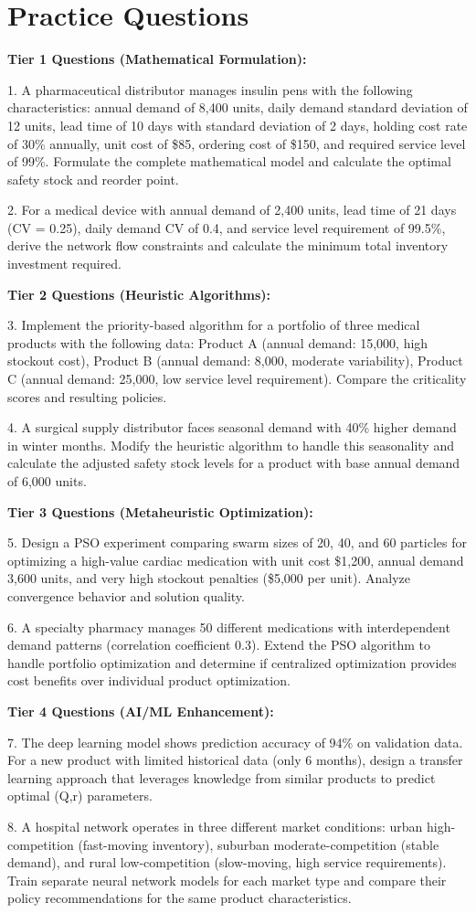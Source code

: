 \documentclass{article}
\begin{document}
\section{Practice Questions}

\textbf{Tier 1 Questions (Mathematical Formulation):}

1. A pharmaceutical distributor manages insulin pens with the following characteristics: annual demand of 8,400 units, daily demand standard deviation of 12 units, lead time of 10 days with standard deviation of 2 days, holding cost rate of 30\% annually, unit cost of \$85, ordering cost of \$150, and required service level of 99\%. Formulate the complete mathematical model and calculate the optimal safety stock and reorder point.

2. For a medical device with annual demand of 2,400 units, lead time of 21 days (CV = 0.25), daily demand CV of 0.4, and service level requirement of 99.5\%, derive the network flow constraints and calculate the minimum total inventory investment required.

\textbf{Tier 2 Questions (Heuristic Algorithms):}

3. Implement the priority-based algorithm for a portfolio of three medical products with the following data: Product A (annual demand: 15,000, high stockout cost), Product B (annual demand: 8,000, moderate variability), Product C (annual demand: 25,000, low service level requirement). Compare the criticality scores and resulting policies.

4. A surgical supply distributor faces seasonal demand with 40\% higher demand in winter months. Modify the heuristic algorithm to handle this seasonality and calculate the adjusted safety stock levels for a product with base annual demand of 6,000 units.

\textbf{Tier 3 Questions (Metaheuristic Optimization):}

5. Design a PSO experiment comparing swarm sizes of 20, 40, and 60 particles for optimizing a high-value cardiac medication with unit cost \$1,200, annual demand 3,600 units, and very high stockout penalties (\$5,000 per unit). Analyze convergence behavior and solution quality.

6. A specialty pharmacy manages 50 different medications with interdependent demand patterns (correlation coefficient 0.3). Extend the PSO algorithm to handle portfolio optimization and determine if centralized optimization provides cost benefits over individual product optimization.

\textbf{Tier 4 Questions (AI/ML Enhancement):}

7. The deep learning model shows prediction accuracy of 94\% on validation data. For a new product with limited historical data (only 6 months), design a transfer learning approach that leverages knowledge from similar products to predict optimal (Q,r) parameters.

8. A hospital network operates in three different market conditions: urban high-competition (fast-moving inventory), suburban moderate-competition (stable demand), and rural low-competition (slow-moving, high service requirements). Train separate neural network models for each market type and compare their policy recommendations for the same product characteristics.
\end{document}
